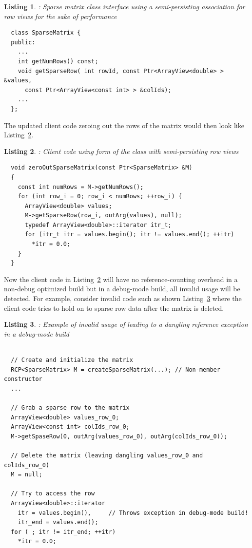 \documentclass[pdf,ps2pdf,11pt]{SANDreport}
\newtheorem{listing}{Listing}
\begin{document}
\begin{listing}: Sparse matrix class interface using a semi-persisting
association for row views for the sake of performance \\
\label{listing:SparseMatrix-ArrayView}
{\small\begin{verbatim}
  class SparseMatrix {
  public:
    ...
    int getNumRows() const;
    void getSparseRow( int rowId, const Ptr<ArrayView<double> > &values,
      const Ptr<ArrayView<const int> > &colIds);
    ...
  };
\end{verbatim}}
\end{listing}


The updated client code zeroing out the rows of the matrix would then
look like Listing~\ref{listing:zeroOutSparseMatrix-ArrayView}.


\begin{listing}: Client code using {} form of the
{} class with semi-persisting row views  \\
\label{listing:zeroOutSparseMatrix-ArrayView}
{\small\begin{verbatim}
  void zeroOutSparseMatrix(const Ptr<SparseMatrix> &M)
  {
    const int numRows = M->getNumRows();
    for (int row_i = 0; row_i < numRows; ++row_i) {
      ArrayView<double> values;
      M->getSparseRow(row_i, outArg(values), null);
      typedef ArrayView<double>::iterator itr_t;
      for (itr_t itr = values.begin(); itr != values.end(); ++itr)
        *itr = 0.0;
    }
  }
\end{verbatim}}
\end{listing}


Now the client code in
Listing~\ref{listing:zeroOutSparseMatrix-ArrayView} will have no
reference-counting overhead in a non-debug optimized build but in a
debug-mode build, all invalid usage will be detected.  For example,
consider invalid code such as shown
Listing~\ref{listing:SparseMatrix-dangling-ref} where the client code
tries to hold on to sparse row data after the matrix is deleted.


\begin{listing}: Example of invalid usage of {} leading
to a dangling reference exception in a debug-mode build  \\
\label{listing:SparseMatrix-dangling-ref}
{\small\begin{verbatim}

  // Create and initialize the matrix
  RCP<SparseMatrix> M = createSparseMatrix(...); // Non-member constructor
  ...

  // Grab a sparse row to the matrix
  ArrayView<double> values_row_0;
  ArrayView<const int> colIds_row_0;
  M->getSpaseRow(0, outArg(values_row_0), outArg(colIds_row_0));

  // Delete the matrix (leaving dangling values_row_0 and colIds_row_0)
  M = null;

  // Try to access the row
  ArrayView<double>::iterator
    itr = values.begin(),     // Throws exception in debug-mode build!
    itr_end = values.end();
  for ( ; itr != itr_end; ++itr)
    *itr = 0.0; 
\end{verbatim}}
\end{listing}
\end{document}
